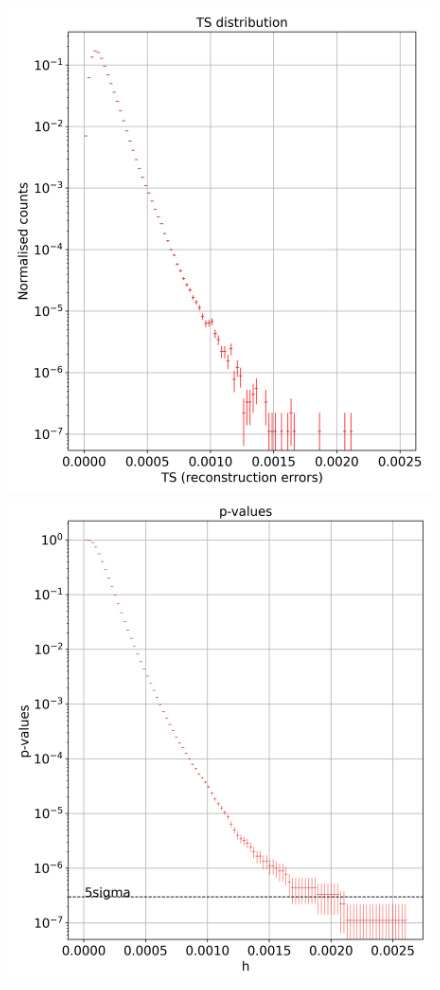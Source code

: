 \begin{figure}[!htb]
    \centering
    \begin{minipage}{0.5\textwidth}
        \centering
        \includegraphics[width=\linewidth]{figures/experiments/p_val/model_1/ts_distribution_bins_100.png}
    \end{minipage}%
    \begin{minipage}{0.5\textwidth}
        \centering
       \includegraphics[width=\linewidth]{figures/experiments/p_val/model_1/pvalue_bins_100.png}

\end{minipage}
\end{figure}
